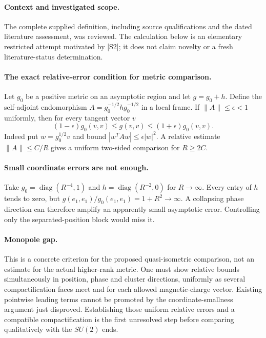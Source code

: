 \documentclass[11pt]{article}
\begin{document}
\paragraph{Context and investigated scope.} The complete supplied definition, including source qualifications and the dated literature assessment, was reviewed. The calculation below is an elementary restricted attempt motivated by [S2]; it does not claim novelty or a fresh literature-status determination.

\paragraph{The exact relative-error condition for metric comparison.} Let $g_0$ be a positive metric on an asymptotic region and let $g=g_0+h$. Define the self-adjoint endomorphism $A=g_0^{-1/2}hg_0^{-1/2}$ in a local frame. If $\|A\|\leq\epsilon<1$ uniformly, then for every tangent vector $v$
\[
 (1-\epsilon)g_0(v,v)\leq g(v,v)\leq(1+\epsilon)g_0(v,v).
\]
Indeed put $w=g_0^{1/2}v$ and bound $|w^TAw|\leq\epsilon|w|^2$. A relative estimate $\|A\|\leq C/R$ gives a uniform two-sided comparison for $R\geq2C$.

\paragraph{Small coordinate errors are not enough.} Take $g_0=\operatorname{diag}(R^{-4},1)$ and $h=\operatorname{diag}(R^{-2},0)$ for $R\to\infty$. Every entry of $h$ tends to zero, but $g(e_1,e_1)/g_0(e_1,e_1)=1+R^2\to\infty$. A collapsing phase direction can therefore amplify an apparently small asymptotic error. Controlling only the separated-position block would miss it.

\paragraph{Monopole gap.} This is a concrete criterion for the proposed quasi-isometric comparison, not an estimate for the actual higher-rank metric. One must show relative bounds simultaneously in position, phase and cluster directions, uniformly as several compactification faces meet and for each allowed magnetic-charge vector. Existing pointwise leading terms cannot be promoted by the coordinate-smallness argument just disproved. Establishing those uniform relative errors and a compatible compactification is the first unresolved step before comparing qualitatively with the $SU(2)$ ends.
\end{document}
